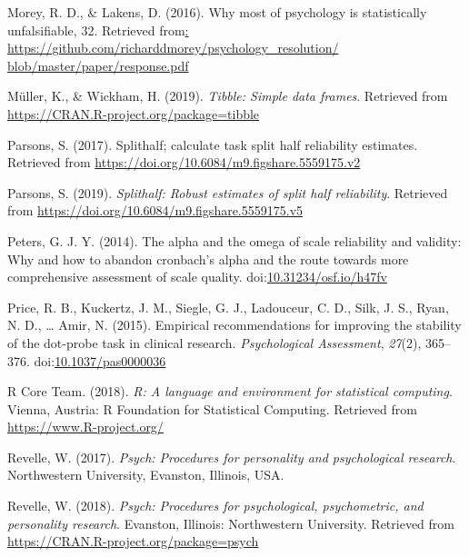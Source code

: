 \documentclass[english,,man,floatsintext]{apa6}
\begin{document}
\leavevmode\hypertarget{ref-morey_why_2016}{}%
Morey, R. D., \& Lakens, D. (2016). Why most of psychology is statistically unfalsiﬁable, 32. Retrieved from\href{:\%20https://github.com/richarddmorey/psychology_resolution/\%20blob/master/paper/response.pdf}{: https://github.com/richarddmorey/psychology\_resolution/ blob/master/paper/response.pdf}

\leavevmode\hypertarget{ref-R-tibble}{}%
Müller, K., \& Wickham, H. (2019). \emph{Tibble: Simple data frames}. Retrieved from \url{https://CRAN.R-project.org/package=tibble}

\leavevmode\hypertarget{ref-R-splithalf}{}%
Parsons, S. (2017). Splithalf; calculate task split half reliability estimates. Retrieved from \url{https://doi.org/10.6084/m9.figshare.5559175.v2}

\leavevmode\hypertarget{ref-parsons_splithalf:_2019}{}%
Parsons, S. (2019). \emph{Splithalf: Robust estimates of split half reliability}. Retrieved from \url{https://doi.org/10.6084/m9.figshare.5559175.v5}

\leavevmode\hypertarget{ref-peters_alpha_2014}{}%
Peters, G. J. Y. (2014). The alpha and the omega of scale reliability and validity: Why and how to abandon cronbach's alpha and the route towards more comprehensive assessment of scale quality. doi:\href{https://doi.org/10.31234/osf.io/h47fv}{10.31234/osf.io/h47fv}

\leavevmode\hypertarget{ref-price_empirical_2015}{}%
Price, R. B., Kuckertz, J. M., Siegle, G. J., Ladouceur, C. D., Silk, J. S., Ryan, N. D., \ldots{} Amir, N. (2015). Empirical recommendations for improving the stability of the dot-probe task in clinical research. \emph{Psychological Assessment}, \emph{27}(2), 365--376. doi:\href{https://doi.org/10.1037/pas0000036}{10.1037/pas0000036}

\leavevmode\hypertarget{ref-R-base}{}%
R Core Team. (2018). \emph{R: A language and environment for statistical computing}. Vienna, Austria: R Foundation for Statistical Computing. Retrieved from \url{https://www.R-project.org/}

\leavevmode\hypertarget{ref-revelle_w_psych:_2017}{}%
Revelle, W. (2017). \emph{Psych: Procedures for personality and psychological research}. Northwestern University, Evanston, Illinois, USA.

\leavevmode\hypertarget{ref-R-psych}{}%
Revelle, W. (2018). \emph{Psych: Procedures for psychological, psychometric, and personality research}. Evanston, Illinois: Northwestern University. Retrieved from \url{https://CRAN.R-project.org/package=psych}
\end{document}
